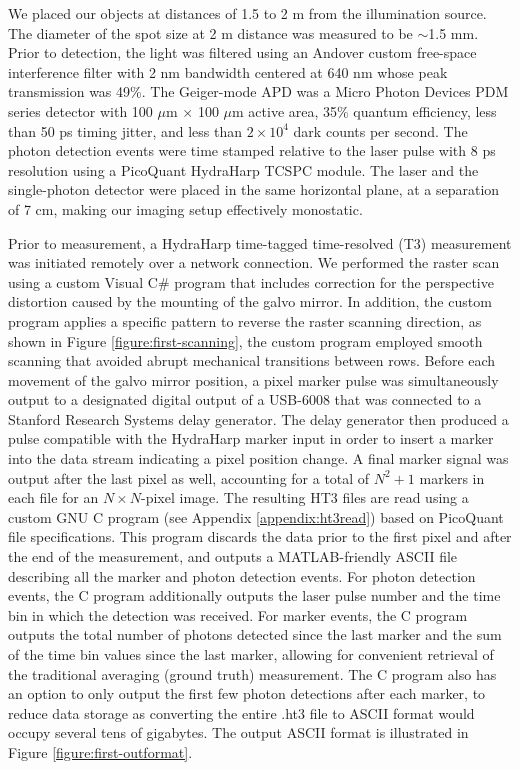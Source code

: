 We placed our objects at distances of 1.5 to 2 m from the illumination source. The diameter of the spot size at 2 m distance was measured to be $\sim$1.5 mm. Prior to detection, the light was filtered using an Andover custom free-space interference filter with 2 nm bandwidth centered at 640 nm whose peak transmission was 49\%. The Geiger-mode APD was a Micro Photon Devices PDM series detector with 100 $\mu$m $\times$ 100 $\mu$m active area, 35\% quantum efficiency, less than 50 ps timing jitter, and less than $2\times 10^4$ dark counts per second. The photon detection events were time stamped relative to the laser pulse with 8 ps resolution using a PicoQuant HydraHarp TCSPC module. The laser and the single-photon detector were placed in the same horizontal plane, at a separation of 7 cm, making our imaging setup effectively monostatic.

Prior to measurement, a HydraHarp time-tagged time-resolved (T3) measurement was initiated remotely over a network connection. We performed the raster scan using a custom Visual C\# program that includes correction for the perspective distortion caused by the mounting of the galvo mirror. In addition, the custom program applies a specific pattern to reverse the raster scanning direction, as shown in Figure \ref{figure:first-scanning}, the custom program employed smooth scanning that avoided abrupt mechanical transitions between rows. Before each movement of the galvo mirror position, a pixel marker pulse was simultaneously output to a designated digital output of a USB-6008 that was connected to a Stanford Research Systems delay generator. The delay generator then produced a pulse compatible with the HydraHarp marker input in order to insert a marker into the data stream indicating a pixel position change. A final marker signal was output after the last pixel as well, accounting for a total of $N^2+1$ markers in each file for an $N \times N$-pixel image. The resulting HT3 files are read using a custom GNU C program (see Appendix \ref{appendix:ht3read}) based on PicoQuant file specifications. This program discards the data prior to the first pixel and after the end of the measurement, and outputs a MATLAB-friendly ASCII file describing all the marker and photon detection events. For photon detection events, the C program additionally outputs the laser pulse number and the time bin in which the detection was received. For marker events, the C program outputs the total number of photons detected since the last marker and the sum of the time bin values since the last marker, allowing for convenient retrieval of the traditional averaging (ground truth) measurement. The C program also has an option to only output the first few photon detections after each marker, to reduce data storage as converting the entire .ht3 file to ASCII format would occupy several tens of gigabytes. The output ASCII format is illustrated in Figure \ref{figure:first-outformat}.

